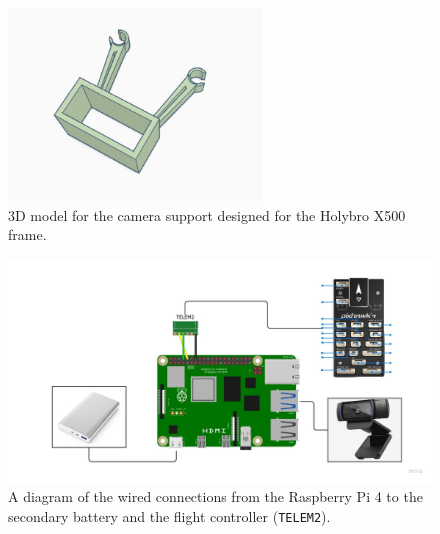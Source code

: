 \begin{figure}
  \centering
  \includegraphics[width=0.6\textwidth, keepaspectratio]{img/cam-holder.jpg}
  \caption{3D model for the camera support designed for the Holybro X500 frame.}
  \label{fig:camera-holder-3d}
\end{figure}


\begin{figure}
  \centering
  \includegraphics[width=\textwidth,keepaspectratio]{img/wiring-diagram.jpg}
  \caption{A diagram of the wired connections from the Raspberry Pi 4 to the secondary battery and the flight controller (\texttt{TELEM2}).}
  \label{fig:wiring}
\end{figure}


